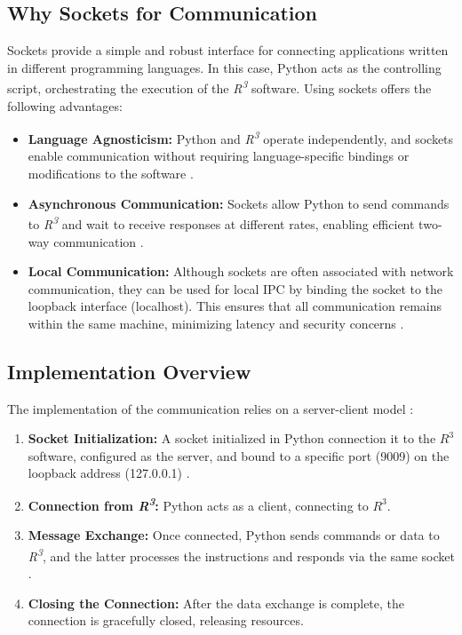 \subsection{Why Sockets for Communication}
\noindent Sockets provide a simple and robust interface for connecting applications written in different programming languages. In this case, Python acts as the controlling script, orchestrating the execution of the \textit{R\textsuperscript{3}} software. Using sockets offers the following advantages:
\begin{itemize}
    \item \textbf{Language Agnosticism:} Python and \textit{R\textsuperscript{3}} operate independently, and sockets enable communication without requiring language-specific bindings or modifications to the software \cite{beejGuide, pythonDocsSocket}.
    \item \textbf{Asynchronous Communication:} Sockets allow Python to send commands to \textit{R\textsuperscript{3}} and wait to receive responses at different rates, enabling efficient two-way communication \cite{stevens2003unix}.
    \item \textbf{Local Communication:} Although sockets are often associated with network communication, they can be used for local IPC by binding the socket to the loopback interface (localhost). This ensures that all communication remains within the same machine, minimizing latency and security concerns \cite{silberschatz2018os}.
\end{itemize}

\subsection{Implementation Overview}
\noindent The implementation of the communication relies on a server-client model \cite{beejGuide}:
\begin{enumerate}
    \item \textbf{Socket Initialization:} A socket initialized in Python connection it to the $R^3$ software, configured as the server, and bound to a specific port (9009) on the loopback address (127.0.0.1) \cite{pythonDocsSocket}.
    \item \textbf{Connection from \textit{R\textsuperscript{3}}:} Python acts as a client, connecting to $R^3$.
    \item \textbf{Message Exchange:} Once connected, Python sends commands or data to \textit{R\textsuperscript{3}}, and the latter processes the instructions and responds via the same socket \cite{stevens2003unix}.
    \item \textbf{Closing the Connection:} After the data exchange is complete, the connection is gracefully closed, releasing resources.
\end{enumerate}


